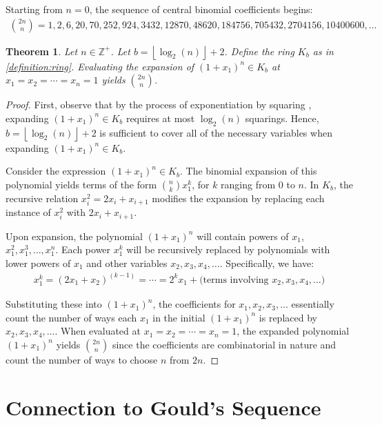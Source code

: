 \documentclass{article}
\theoremstyle{plain}
\theoremstyle{definition}
\newtheorem{theorem}{Theorem}
\newcommand{\floor}[1]{\left\lfloor #1 \right\rfloor}
\newcommand{\Z}{\mathbb{Z}}
\newcommand{\K}{K}
\begin{document}
Starting from $n=0$, the sequence of central binomial coefficients begins:
\begin{align*}
    \binom{2n}{n} = 1, 2, 6, 20, 70, 252, 924, 3432, 12870, 48620, 184756, 705432, 2704156, 10400600, \ldots
\end{align*}

\label{section:cbc}
\begin{theorem} \label{theorem:cbc}
\textit{
Let $n \in \Z^+$. Let $b={\floor{\log_2(n)}+2}$. Define the ring $\K_b$ as in \cref{definition:ring}. Evaluating the expansion of $(1+x_1)^n \in \K_b$ at $x_1=x_2=\cdots=x_n=1$ yields $\binom{2n}{n}$.
}
\end{theorem}
\begin{proof}
First, observe that by the process of exponentiation by squaring \cite{knuth1997art}, expanding $(1+x_1)^n \in \K_b$ requires at most $\log_2(n)$ squarings. Hence, $b={\floor{\log_2(n)}+2}$ is sufficient to cover all of the necessary variables when expanding $(1+x_1)^n \in \K_b$.

Consider the expression $(1+x_1)^n \in \K_b$. The binomial expansion of this polynomial yields terms of the form $\binom{n}{k} x_1^k$, for $k$ ranging from $0$ to $n$. In $\K_b$, the recursive relation $x_i^2 = 2x_i + x_{i+1}$ modifies the expansion by replacing each instance of $x_i^2$ with $2x_i + x_{i+1}$.

Upon expansion, the polynomial $(1+x_1)^n$ will contain powers of $x_1$, $x_1^2, x_1^3, \ldots, x_1^n$. Each power $x_1^k$ will be recursively replaced by polynomials with lower powers of $x_1$ and other variables $x_2, x_3, x_4, \ldots$. Specifically, we have:
\begin{align}
    x_1^k = (2x_1+x_2)^{(k-1)} = \cdots = 2^k x_1 + \text{(terms involving $x_2, x_3, x_4, \ldots$)}
\end{align}

Substituting these into $(1+x_1)^n$, the coefficients for $x_1, x_2, x_3, \ldots$ essentially count the number of ways each $x_1$ in the initial $(1+x_1)^n$ is replaced by $x_2, x_3, x_4, \ldots$. When evaluated at $x_1=x_2=\cdots=x_n=1$, the expanded polynomial $(1+x_1)^n$ yields $\binom{2n}{n}$ since the coefficients are combinatorial in nature and count the number of ways to choose $n$ from $2n$.
\end{proof}

\section{Connection to Gould's Sequence} \label{section:goulds}
\end{document}
